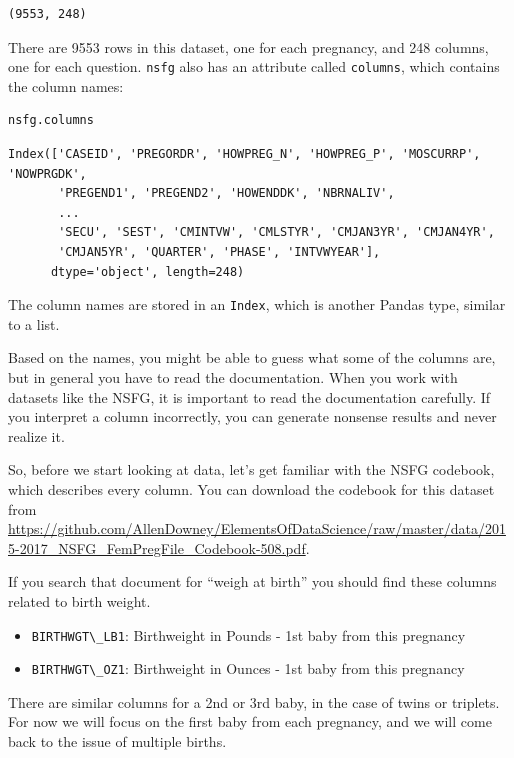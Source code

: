 \begin{lstlisting}[style=output]
(9553, 248)
\end{lstlisting}

There are 9553 rows in this dataset, one for each pregnancy, and 248
columns, one for each question. \passthrough{\lstinline!nsfg!} also has
an attribute called \passthrough{\lstinline!columns!}, which contains
the column names:

\begin{lstlisting}[language=Python,style=source]
nsfg.columns
\end{lstlisting}

\begin{lstlisting}[style=output]
Index(['CASEID', 'PREGORDR', 'HOWPREG_N', 'HOWPREG_P', 'MOSCURRP', 'NOWPRGDK',
       'PREGEND1', 'PREGEND2', 'HOWENDDK', 'NBRNALIV',
       ...
       'SECU', 'SEST', 'CMINTVW', 'CMLSTYR', 'CMJAN3YR', 'CMJAN4YR',
       'CMJAN5YR', 'QUARTER', 'PHASE', 'INTVWYEAR'],
      dtype='object', length=248)
\end{lstlisting}

The column names are stored in an \passthrough{\lstinline!Index!}, which
is another Pandas type, similar to a list.

Based on the names, you might be able to guess what some of the columns
are, but in general you have to read the documentation. When you work
with datasets like the NSFG, it is important to read the documentation
carefully. If you interpret a column incorrectly, you can generate
nonsense results and never realize it.

So, before we start looking at data, let's get familiar with the NSFG
codebook, which describes every column. You can download the codebook
for this dataset from
\url{https://github.com/AllenDowney/ElementsOfDataScience/raw/master/data/2015-2017_NSFG_FemPregFile_Codebook-508.pdf}.

If you search that document for ``weigh at birth'' you should find these
columns related to birth weight.

\begin{itemize}
\item
  \passthrough{\lstinline!BIRTHWGT\_LB1!}: Birthweight in Pounds - 1st
  baby from this pregnancy
\item
  \passthrough{\lstinline!BIRTHWGT\_OZ1!}: Birthweight in Ounces - 1st
  baby from this pregnancy
\end{itemize}

There are similar columns for a 2nd or 3rd baby, in the case of twins or
triplets. For now we will focus on the first baby from each pregnancy,
and we will come back to the issue of multiple births.

